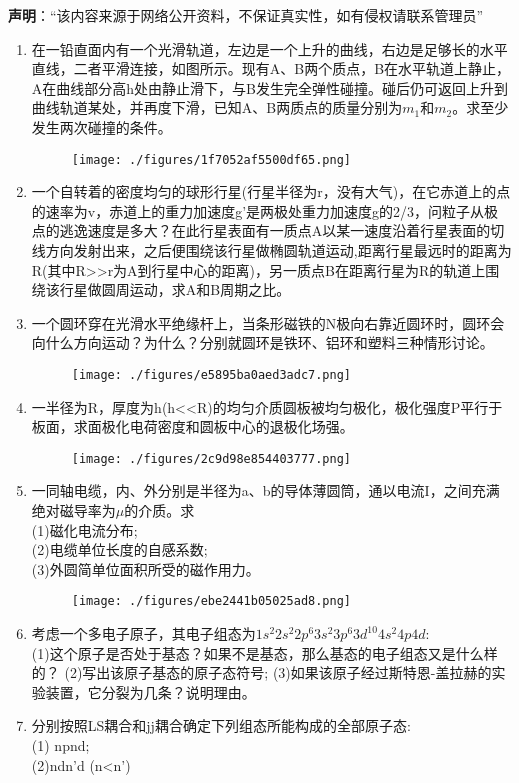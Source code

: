 
\textbf{声明}：“该内容来源于网络公开资料，不保证真实性，如有侵权请联系管理员”
\begin{enumerate}
$h$的岸上有人用绳索拉船靠岸。人以匀速率$v$拉绳，求当船离岸的距离为$s$的时候，船的速度和加速度。
\item 在一铅直面内有一个光滑轨道，左边是一个上升的曲线，右边是足够长的水平直线，二者平滑连接，如图所示。现有A、B两个质点，B在水平轨道上静止，A在曲线部分高h处由静止滑下，与B发生完全弹性碰撞。碰后仍可返回上升到曲线轨道某处，并再度下滑，已知A、B两质点的质量分别为$m_1$和$m_2$。求至少发生两次碰撞的条件。
\begin{figure}[ht]
\centering
\texttt{[image: ./figures/1f7052af5500df65.png]}
\caption{} \label{fig_ZKD14B_1}
\end{figure}
\item 一个自转着的密度均匀的球形行星(行星半径为r，没有大气)，在它赤道上的点的速率为v，赤道上的重力加速度g'是两极处重力加速度g的2/3，问粒子从极点的逃逸速度是多大？在此行星表面有一质点A以某一速度沿着行星表面的切线方向发射出来，之后便围绕该行星做椭圆轨道运动,距离行星最远时的距离为R(其中R>>r为A到行星中心的距离)，另一质点B在距离行星为R的轨道上围绕该行星做圆周运动，求A和B周期之比。
\item 一个圆环穿在光滑水平绝缘杆上，当条形磁铁的N极向右靠近圆环时，圆环会向什么方向运动？为什么？分别就圆环是铁环、铝环和塑料三种情形讨论。
\begin{figure}[ht]
\centering
\texttt{[image: ./figures/e5895ba0aed3adc7.png]}
\caption{} \label{fig_ZKD14B_2}
\end{figure}
\item 一半径为R，厚度为h(h<<R)的均匀介质圆板被均匀极化，极化强度P平行于板面，求面极化电荷密度和圆板中心的退极化场强。
\begin{figure}[ht]
\centering
\texttt{[image: ./figures/2c9d98e854403777.png]}
\caption{} \label{fig_ZKD14B_3}
\end{figure}
\item 一同轴电缆，内、外分别是半径为a、b的导体薄圆筒，通以电流I，之间充满绝对磁导率为$\mu$的介质。求\\
(1)磁化电流分布;\\
(2)电缆单位长度的自感系数;\\
(3)外圆简单位面积所受的磁作用力。
\begin{figure}[ht]
\centering
\texttt{[image: ./figures/ebe2441b05025ad8.png]}
\caption{} \label{fig_ZKD14B_4}
\end{figure}
\item 考虑一个多电子原子，其电子组态为$1s^2 2s^2 2p^6 3s^2 3p^6 3d^{10}4s^2 4p4d$:\\
(1)这个原子是否处于基态？如果不是基态，那么基态的电子组态又是什么样的？
(2)写出该原子基态的原子态符号;
(3)如果该原子经过斯特恩-盖拉赫的实验装置，它分裂为几条？说明理由。
\item 分别按照LS耦合和jj耦合确定下列组态所能构成的全部原子态:\\
(1) npnd;\\
(2)ndn'd (n<n')
\end{enumerate}